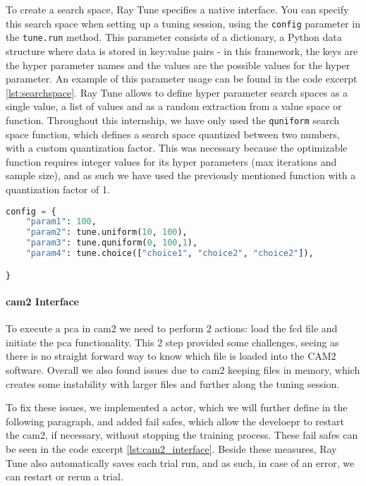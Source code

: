 To create a search space, Ray Tune specifies a native interface. You can specify this search space when setting up a tuning session, using the \verb!config! parameter in the \verb!tune.run! method. This parameter consists of a dictionary, a Python data structure where data is stored in key:value pairs - in this framework, the keys are the hyper parameter names and the values are the possible values for the hyper parameter. An example of this parameter usage can be found in the code excerpt \ref{lst:searchspace}. Ray Tune allows to define hyper parameter search spaces as a single value, a list of values and as a random extraction from a value space or function. Throughout this internship, we have only used the \verb!quniform! search space function, which defines a search space quantized between two numbers, with a custom quantization factor. This was necessary because the optimizable function requires integer values for its hyper parameters (max iterations and sample size), and as such we have used the previously mentioned function with a quantization factor of 1.


\begin{lstlisting}[language=Python, caption=Example Ray Tune configuration, captionpos=b, label={lst:searchspace}]
config = {
    "param1": 100,
    "param2": tune.uniform(10, 100),
    "param3": tune.quniform(0, 100,1),
    "param4": tune.choice(["choice1", "choice2", "choice2"]),

}
\end{lstlisting}

\paragraph{\acrshort{cam2} Interface}

To execute a \acrshort{pca} in \acrshort{cam2} we need to perform 2 actions: load the \acrshort{fcd} file and initiate the \acrshort{pca} functionality. This 2 step provided some challenges, seeing as there is no straight forward way to know which file is loaded into the CAM2 software. Overall we also found issues due to \acrshort{cam2} keeping files in memory, which creates some instability with larger files and further along the tuning session.

To fix these issues, we implemented a actor, which we will further define in the following paragraph, and added fail safes, which allow the develoepr to restart the \acrshort{cam2}, if necessary, without stopping the training process. These fail safes can be seen in the code excerpt \ref{lst:cam2_interface}. Beside these measures, Ray Tune also automatically saves each trial run, and as such, in case of an error, we can restart or rerun a trial.

